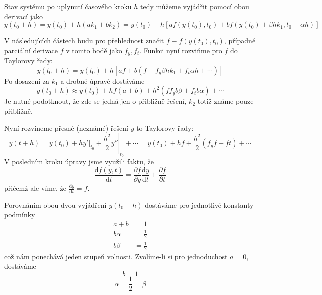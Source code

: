 \documentclass[a4paper,11pt]{article}
\begin{document}
Stav systému po uplynutí časového kroku $h$ tedy můžeme vyjádřit pomocí obou derivací jako
\begin{equation*}
    y(t_0 + h) = y(t_0) + h (a k_1 + b k_2) = y(t_0) + h [a f(y(t_0), t_0) + b f(y(t_0) + \beta h k_1, t_0 + \alpha h)]
\end{equation*}

V následujících částech budu pro přehlednost značit $f \equiv f(y(t_0), t_0)$, 
případně parciální derivace $f$ v tomto bodě jako $f_y, f_t$.
Funkci nyní rozviňme pro $f$ do Taylorovy řady:
\begin{equation*}
    y(t_0 + h) = y(t_0) + h[a f + b (f + f_y \beta h k_1 + f_t \alpha h + \cdots)]
\end{equation*}
Po dosazení za $k_1$ a drobné úpravě dostáváme
\begin{equation*}
    y(t_0 + h) \approx y(t_0) + hf(a + b) + h^2 (f f_y b \beta + f_t b \alpha) + \cdots
\end{equation*}
Je nutné podotknout, že zde se jedná jen o přibližně řešení, $k_2$ totiž známe pouze přibližně.

Nyní rozvineme přesné (neznámé) řešení $y$ to Taylorovy řady:
\begin{equation*}
    y(t + h) = y(t_0) + \left. hy' \right\rvert_{t_0} + \left. \frac{h^2}{2} y'' \right\rvert_{t_0} + \cdots = y(t_0) + hf + \frac{h^2}{2} (f_y f + ft) + \cdots
\end{equation*}
V posledním kroku úpravy jsme využili faktu, že
\begin{equation*}
    \frac{\mathrm{d} f(y, t)}{\mathrm{d} t} = \frac{\partial f}{\partial y} \frac{\mathrm{d} y}{\mathrm{d} t} + \frac{\partial f}{\partial t}
\end{equation*}
přičemž ale víme, že $\frac{\mathrm{d} y}{\mathrm{d} t} = f$.

Porovnáním obou dvou vyjádření $y(t_0 + h)$ dostáváme pro jednotlivé konstanty podmínky
\begin{align*}
    a + b &= 1 \\
    b \alpha &= \frac{1}{2} \\
    b \beta &= \frac{1}{2}
\end{align*}
což nám ponechává jeden stupeň volnosti. Zvolíme-li si pro jednoduchost $a=0$, dostáváme
\begin{equation*}
    b = 1
\end{equation*}
\begin{equation*}
    \alpha = \frac{1}{2} = \beta
\end{equation*}
\end{document}
